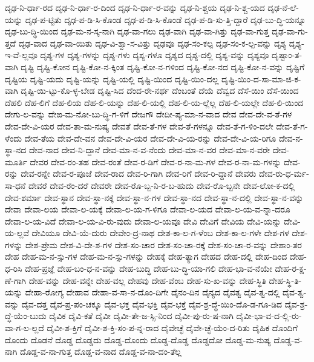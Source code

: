 {ದೃಢ-ನಿ-ರ್ಧಾ-ರದ
ದೃಢ-ನಿ-ರ್ಧಾ-ರ-ದಿಂದ
ದೃಢ-ನಿ-ರ್ಧಾ-ರ-ವನ್ನು
ದೃಢ-ನಿ-ಶ್ಚಯ
ದೃಢ-ನಿ-ಶ್ಚ-ಯದ
ದೃಢ-ನೆ-ಲೆ-ಯನ್ನು
ದೃಢ-ಪ-ಟ್ಟಿತು
ದೃಢ-ಪ-ಡಿ-ಸಿ-ಕೊಂಡ
ದೃಢ-ಪ-ಡಿ-ಸಿ-ಕೊಂಡೆ
ದೃಢ-ಪ-ಡಿ-ಸು-ತ್ತಿ-ದ್ದಾರೆ
ದೃಢ-ಬು-ದ್ಧಿ-ಯನ್ನೂ
ದೃಢ-ಬು-ದ್ಧಿ-ಯಿಂದ
ದೃಢ-ಮ-ನ-ಸ್ಕ-ನಾಗಿ
ದೃಢ-ವಾ-ಗಲು
ದೃಢ-ವಾಗಿ
ದೃಢ-ವಾ-ಗಿತ್ತು
ದೃಢ-ವಾ-ಗುತ್ತ
ದೃಢ-ವಾ-ಗು-ತ್ತದೆ
ದೃಢ-ವಾದ
ದೃಢ-ವಾ-ಯಿತು
ದೃಢ-ವಿ-ಶ್ವಾ-ಸ-ವಿತ್ತು
ದೃಢವೂ
ದೃಢ-ಸಂ-ಕಲ್ಪ
ದೃಢ-ಸಂ-ಕ-ಲ್ಪ-ವನ್ನು
ದೃಶ್ಯ
ದೃಶ್ಯ-ಇ-ವೆ-ಲ್ಲವೂ
ದೃಶ್ಯ-ಗಳ
ದೃಶ್ಯ-ಗಳನ್ನು
ದೃಶ್ಯ-ಗಳು
ದೃಶ್ಯ-ಗಳೂ
ದೃಶ್ಯದ
ದೃಶ್ಯ-ದಲ್ಲಿ
ದೃಶ್ಯ-ವನ್ನು
ದೃಶ್ಯವೂ
ದೃಷ್ಟಾಂ-ತ-ವಾಗಿ
ದೃಷ್ಟಿ
ದೃಷ್ಟಿ-ಕೋನ
ದೃಷ್ಟಿ-ಕೋ-ನ-ಕ್ಕಿಂತ
ದೃಷ್ಟಿ-ಕೋ-ನ-ಗಳಿಂದ
ದೃಷ್ಟಿ-ಕೋ-ನದ
ದೃಷ್ಟಿ-ಕೋ-ನ-ವನ್ನು
ದೃಷ್ಟಿಗೆ
ದೃಷ್ಟಿಯ
ದೃಷ್ಟಿ-ಯದು
ದೃಷ್ಟಿ-ಯನ್ನು
ದೃಷ್ಟಿ-ಯಲ್ಲಿ
ದೃಷ್ಟಿ-ಯಿಂದ
ದೃಷ್ಟಿ-ಯಿಂ-ದಲ್ಲ
ದೃಷ್ಟಿ-ಯಿಂ-ದ-ಸಾ-ಮಾ-ಜಿ-ಕ-ವಾಗಿ
ದೃಷ್ಟಿ-ಯಿ-ಟ್ಟು-ಕೊ-ಳ್ಳ-ಬೇಡ
ದೃಷ್ಟಿ-ಸಿದ
ದೆಂದ-ರೇ-ನರ್ಥ
ದೆಂಬಂತೆ
ದೆಯೆ
ದೆವ್ವದ
ದೆಸೆ-ಯಿಂ
ದೆಸೆ-ಯಿಂದ
ದೆಹಲಿ
ದೆಹ-ಲಿಗೆ
ದೆಹ-ಲಿಯ
ದೆಹ-ಲಿ-ಯನ್ನು
ದೆಹ-ಲಿ-ಯಲ್ಲಿ
ದೆಹ-ಲಿ-ಯ-ಲ್ಲೆಲ್ಲ
ದೆಹ-ಲಿ-ಯಲ್ಲೇ
ದೆಹ-ಲಿ-ಯಿಂದ
ದೇಗು-ಲ-ವನ್ನು
ದೇಙ-ಮ-ನೋ-ಬು-ದ್ಧಿ-ಗ-ಳಿಗೆ
ದೇಜಗೌ
ದೇದೀ-ಪ್ಯ-ಮಾ-ನ-ವಾದ
ದೇವ
ದೇವ-ದೇ-ವ-ತೆ-ಗಳ
ದೇವ-ದೇ-ವಿ-ಯರ
ದೇವ-ತಾ-ಮ-ನುಷ್ಯ
ದೇವತೆ
ದೇವ-ತೆ-ಗಳ
ದೇವ-ತೆ-ಗಳನ್ನೂ
ದೇವ-ತೆ-ಗ-ಳಿಂ-ದಲೇ
ದೇವ-ತೆ-ಗ-ಳೆಂದು
ದೇವ-ತೆಯ
ದೇವ-ದೇ-ವನ
ದೇವ-ದೇ-ವಿ-ಯರ
ದೇವ-ದೇ-ವಿ-ಯ-ರನ್ನು
ದೇವ-ದೇ-ವಿ-ಯ-ರಿಗೂ
ದೇವ-ನ-ಸ್ಥಾ-ನದ
ದೇವ-ನಾದ
ದೇವ-ನಿ-ದ್ದಾನೆ
ದೇವ-ಮಾ-ನ-ವ-ನೆಂದು
ದೇವ-ಮಾ-ನ-ವರ
ದೇವ-ಮಾ-ನ-ವರೇ
ದೇವ-ಮೂರ್ತಿ
ದೇವರ
ದೇವ-ರಂ-ತಹ
ದೇವ-ರಂತೆ
ದೇವ-ರ-ಡಿಗೆ
ದೇವ-ರ-ನಾ-ಮ-ಗಳ
ದೇವ-ರ-ನಾ-ಮ-ಗಳನ್ನು
ದೇವ-ರನ್ನು
ದೇವ-ರನ್ನೇ
ದೇವ-ರ-ಪೂಜೆ
ದೇವ-ರಾದ
ದೇವ-ರಿ-ಗಾಗಿ
ದೇವ-ರಿಗೆ
ದೇವ-ರಿ-ದ್ದಾನೆ
ದೇವರು
ದೇವ-ರು-ಧ-ರ್ಮ-ಸಾ-ಧನೆ
ದೇವರೆ
ದೇವ-ರೆಂ-ದರೆ
ದೇವರೇ
ದೇವ-ರೊ-ಬ್ಬ-ನಿ-ರ-ಬ-ಹುದು
ದೇವ-ರೊ-ಬ್ಬನೇ
ದೇವ-ಲೋ-ಕ-ದಲ್ಲಿ
ದೇವ-ಶರ್ಮಾ
ದೇವ-ಸ್ಥಾನ
ದೇವ-ಸ್ಥಾ-ನಕ್ಕೆ
ದೇವ-ಸ್ಥಾ-ನ-ಗಳ
ದೇವ-ಸ್ಥಾ-ನದ
ದೇವ-ಸ್ಥಾ-ನ-ದಲ್ಲಿ
ದೇವ-ಸ್ಥಾ-ನ-ವನ್ನು
ದೇವಾ
ದೇವಾ-ಲಯ
ದೇವಾ-ಲ-ಯಕ್ಕೆ
ದೇವಾ-ಲ-ಯ-ಗ-ಳಿಗೂ
ದೇವಾ-ಲ-ಯದ
ದೇವಾ-ಲ-ಯ-ವ-ನ್ನಾ-ದರೂ
ದೇವಾ-ಲ-ಯ-ವಿದೆ
ದೇವಾ-ಲ-ಯ-ವಿ-ರು-ವುದು
ದೇವಾ-ಲ-ಯವೂ
ದೇವಿ
ದೇವಿಗೆ
ದೇವಿಯ
ದೇವಿ-ಯನ್ನು
ದೇವಿ-ಯ-ಲ್ಲವೆ
ದೇವಿಯೂ
ದೇವಿ-ಯೆ-ದುರು
ದೇವೇಂ-ದ್ರ-ನಾಥ
ದೇಶ-ಕಾ-ಲ-ಗ-ಳೆಂಬ
ದೇಶ-ಕಾ-ಲ-ಗಳೇ
ದೇಶ-ಗಳ
ದೇಶ-ಗಳನ್ನು
ದೇಶ-ಪ್ರೇಮ
ದೇಶ-ವಿ-ದೇ-ಶ-ಗಳ
ದೇಶ-ಸಂ-ಚಾರ
ದೇಶ-ಸಂ-ಚಾ-ರಕ್ಕೆ
ದೇಶ-ಸಂ-ಚಾ-ರ-ವನ್ನು
ದೇಶಾಂ-ತರ
ದೇಹ
ದೇಹ-ಮ-ನ-ಸ್ಸು-ಗಳ
ದೇಹ-ಮ-ನ-ಸ್ಸು-ಗಳನ್ನು
ದೇಹಕ್ಕೆ
ದೇಹ-ತ್ಯಾಗ
ದೇಹದ
ದೇಹ-ದಲ್ಲಿ
ದೇಹ-ದಿಂದ
ದೇಹ-ಧ-ರಿಸಿ
ದೇಹ-ಪ್ರಜ್ಞೆ
ದೇಹ-ಬಂ-ಧ-ನ-ವನ್ನು
ದೇಹ-ಬುದ್ಧಿ
ದೇಹ-ಬು-ದ್ಧಿ-ಯಾ-ಗಲಿ
ದೇಹ-ಭಾ-ವ-ನೆಯೇ
ದೇಹ-ರ-ಕ್ಷ-ಣೆ-ಗಾಗಿ
ದೇಹ-ವನ್ನು
ದೇಹ-ವನ್ನೇ
ದೇಹ-ವಲ್ಲ
ದೇಹವು
ದೇಹ-ವೆಂಬ
ದೇಹ-ಸು-ಖ-ವನ್ನು
ದೇಹ-ಸ್ಥಿತಿ
ದೇಹ-ಸ್ಥಿ-ತಿ-ಯನ್ನು
ದೇಹಾ-ರೋಗ್ಯ
ದೇಹಾವ
ದೇಹಾ-ವ-ಸಾ-ನ-ದೊಂ-ದಿಗೇ
ದೈನಂ-ದಿನ
ದೈನ್ಯದ
ದೈವತ್ವ
ದೈವ-ತ್ವ-ದಲ್ಲಿ
ದೈವ-ತ್ವ-ವನ್ನು
ದೈವ-ದತ್ತ
ದೈವ-ಪ್ರ-ಪಂ-ಚಕ್ಕೂ
ದೈವ-ಭಕ್ತ
ದೈವ-ಭಕ್ತಿ
ದೈವ-ಭಕ್ತೆ
ದೈವ-ಶ್ರ-ದ್ಧೆ-ಯಿಂ-ದೊ-ಡ-ಗೂ-ಡಿದ
ದೈವ-ಶ್ರ-ದ್ಧೆ-ಯೆಂ-ಬುದು
ದೈವಿಕ
ದೈವಿ-ಕತೆ
ದೈವೀ
ದೈವೀ-ತೇ-ಜ-ಸ್ಸಿ-ನಿಂದ
ದೈವೀ-ಪು-ರು-ಷ-ನಾಗಿ
ದೈವೀ-ಭಾ-ವ-ದ-ಲ್ಲಿ-ರು-ವಾ-ಗ-ಲ-ಲ್ಲದೆ
ದೈವೀ-ಶ-ಕ್ತಿಗೆ
ದೈವೀ-ಶ-ಕ್ತಿ-ಸಂ-ಪ-ನ್ನ-ರಾದ
ದೈವೇಚ್ಛೆ
ದೈವೇ-ಚ್ಛೆ-ಯೆಂ-ದ-ರಿತು
ದೈಹಿಕ
ದೊಂದಿಗೆ
ದೊಂದು
ದೊಡನೆ
ದೊಡ್ಡ
ದೊಡ್ಡದು
ದೊಡ್ಡ-ದೊಂದು
ದೊಡ್ಡ-ದೊಡ್ಡ
ದೊಡ್ಡದೋ
ದೊಡ್ಡ-ಮ-ನುಷ್ಯ
ದೊಡ್ಡ-ವ-ನಾಗಿ
ದೊಡ್ಡ-ವ-ನಾ-ಗುತ್ತ
ದೊಡ್ಡ-ವ-ನಾದ
ದೊಡ್ಡ-ವ-ನಾ-ದಂ-ತೆಲ್ಲ
}
